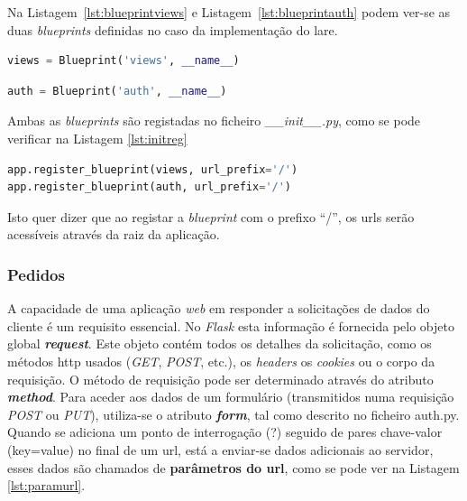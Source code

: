 Na Listagem~\ref{lst:blueprintviews} e Listagem~\ref{lst:blueprintauth} podem ver-se as duas \textit{blueprints} definidas no caso da implementação do \acrshort{lare}.
\begin{center}
	\begin{minipage}{0.7\linewidth}
		\begin{lstlisting}[language=Python, caption=\textit{Blueprint views} - \textit{views.py}, label=lst:blueprintviews]
views = Blueprint('views', __name__)
\end{lstlisting}
	\end{minipage}
\end{center}

\begin{center}
	\begin{minipage}{0.7\linewidth}
		\begin{lstlisting}[language=Python, caption=\textit{Blueprint auth} - \textit{auth.py}, label=lst:blueprintauth]
auth = Blueprint('auth', __name__)
\end{lstlisting}
	\end{minipage}
\end{center}

Ambas as \textit{blueprints} são registadas no ficheiro \textit{\_\_init\_\_.py}, como se pode verificar na Listagem \ref{lst:initreg}

\begin{center}
	\begin{minipage}{0.7\linewidth}
		\begin{lstlisting}[language=Python, caption=Registo das \textit{blueprints} - \textit{\_\_init\_\_.py}, label=lst:initreg]
app.register_blueprint(views, url_prefix='/')
app.register_blueprint(auth, url_prefix='/')
\end{lstlisting}
	\end{minipage}
\end{center}

Isto quer dizer que ao registar a \textit{blueprint} com o prefixo ``/'', os \acrshort{url}s serão acessíveis através da raiz da aplicação.

\subsubsection{Pedidos}
A capacidade de uma aplicação \textit{web} em responder a solicitações de dados do cliente é um requisito essencial. No \textit{Flask} esta informação é fornecida pelo objeto global \textit{\textbf{request}}. Este objeto contém todos os detalhes da solicitação, como os métodos \acrshort{http} usados (\textit{GET}, \textit{POST}, etc.), os \textit{headers} os \textit{cookies} ou o corpo da requisição. O método de requisição pode ser determinado através do atributo \textit{\textbf{method}}. Para aceder aos dados de um formulário (transmitidos numa requisição \textit{POST} ou \textit{PUT}), utiliza-se o atributo \textit{\textbf{form}}, tal como descrito no ficheiro auth.py. Quando se adiciona um ponto de interrogação (?) seguido de pares chave-valor (key=value) no final de um \acrshort{url}, está a enviar-se dados adicionais ao servidor, esses dados são chamados de \textbf{parâmetros do \acrshort{url}}, como se pode ver na Listagem \ref{lst:paramurl}.

